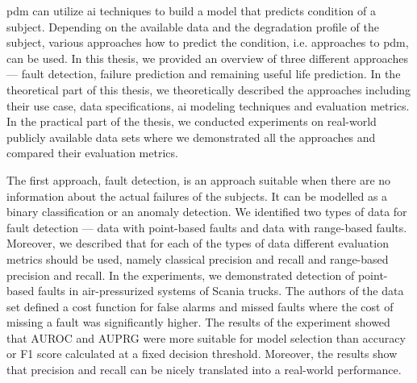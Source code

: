 \begin{conclusion}

\Acrshort{pdm} can utilize \acrshort{ai} techniques to build a model that predicts condition of a subject.
Depending on the available data and the degradation profile of the subject, various approaches how to predict the condition, i.e. approaches to \acrshort{pdm}, can be used.
In this thesis, we provided an overview of three different approaches --- fault detection, failure prediction and remaining useful life prediction.
In the theoretical part of this thesis, we theoretically described the approaches including their use case, data specifications, \acrshort{ai} modeling techniques and evaluation metrics.
In the practical part of the thesis, we conducted experiments on real-world publicly available data sets where we demonstrated all the approaches and compared their evaluation metrics.

The first approach, fault detection, is an approach suitable when there are no information about the actual failures of the subjects.
It can be modelled as a binary classification or an anomaly detection.
We identified two types of data for fault detection --- data with point-based faults and data with range-based faults.
Moreover, we described that for each of the types of data different evaluation metrics should be used, namely classical precision and recall and range-based precision and recall.
In the experiments, we demonstrated detection of point-based faults in air-pressurized systems of Scania trucks.
The authors of the data set defined a cost function for false alarms and missed faults where the cost of missing a fault was significantly higher.
The results of the experiment showed that AUROC and AUPRG were more suitable for model selection than accuracy or F1 score calculated at a fixed decision threshold.
Moreover, the results show that precision and recall can be nicely translated into a real-world performance.


\end{conclusion}
